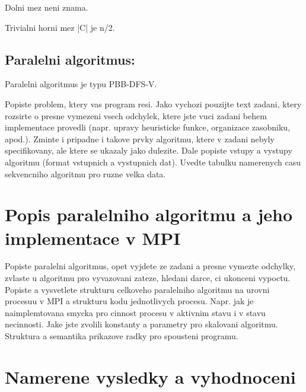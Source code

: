 \documentclass[a4paper]{article}
\begin{document}
Dolni mez neni znama.

Trivialni horni mez |C| je n/2.
\subsection{Paralelni algoritmus:}
Paralelni algoritmus je typu PBB-DFS-V.

Popiste problem, ktery vas program resi. Jako vychozi pouzijte text
zadani, ktery rozsirte o presne vymezeni vsech odchylek, ktere jste
vuci zadani behem implementace provedli 
(napr.  upravy heuristicke funkce, organizace zasobniku,
apod.). Zminte i pripadne i takove prvky algoritmu, ktere v zadani
nebyly specifikovany, ale ktere se ukazaly jako dulezite.  Dale
popiste vstupy a vystupy algoritmu (format vstupnich a vystupnich
dat). Uvedte tabulku namerenych casu sekvencniho algoritmu pro ruzne
velka data.

\section{Popis paralelniho algoritmu a jeho implementace v MPI}

Popiste paralelni algoritmus, opet vyjdete ze zadani a presne vymezte
odchylky, zvlaste u algoritmu pro vyvazovani zateze, hledani darce, ci
ukonceni vypoctu.  Popiste a vysvetlete strukturu celkoveho
paralelniho algoritmu na urovni procesuu v MPI a strukturu kodu
jednotlivych procesu. Napr. jak je naimplemtovana smycka pro cinnost
procesu v aktivnim stavu i v stavu necinnosti. Jake jste zvolili
konstanty a parametry pro skalovani algoritmu. Struktura a semantika
prikazove radky pro spousteni programu.

\section{Namerene vysledky a vyhodnoceni}
\end{document}
